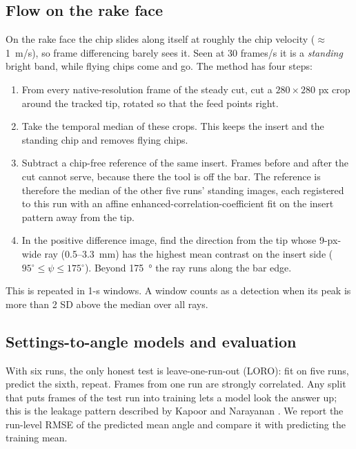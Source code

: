 \documentclass[conference,a4paper]{IEEEtran}
\newcommand{\degr}{\ensuremath{^\circ}}
\begin{document}
\subsection{Flow on the rake face}\label{sec:m-face}
On the rake face the chip slides along itself at roughly the chip velocity ($\approx$\SI{1}{m/s}), so frame differencing barely sees it.
Seen at 30 frames/s it is a \emph{standing} bright band, while flying chips come and go.
The method has four steps:
\begin{enumerate}
\item From every native-resolution frame of the steady cut, cut a $280\times280$ px crop around the tracked tip, rotated so that the feed points right.
\item Take the temporal median of these crops. This keeps the insert and the standing chip and removes flying chips.
\item Subtract a chip-free reference of the same insert. Frames before and after the cut cannot serve, because there the tool is off the bar. The reference is therefore the median of the other five runs' standing images, each registered to this run with an affine enhanced-correlation-coefficient fit \cite{evangelidis2008} on the insert pattern away from the tip.
\item In the positive difference image, find the direction from the tip whose 9-px-wide ray (0.5--\SI{3.3}{mm}) has the highest mean contrast on the insert side ($95\degr\le\psi\le175\degr$). Beyond \SI{175}{\degree} the ray runs along the bar edge.
\end{enumerate}
This is repeated in 1-s windows.
A window counts as a detection when its peak is more than 2 SD above the median over all rays.

\subsection{Settings-to-angle models and evaluation}\label{sec:m-models}
With six runs, the only honest test is leave-one-run-out (LORO): fit on five runs, predict the sixth, repeat.
Frames from one run are strongly correlated.
Any split that puts frames of the test run into training lets a model look the answer up; this is the leakage pattern described by Kapoor and Narayanan \cite{kapoor2023}.
We report the run-level RMSE of the predicted mean angle and compare it with predicting the training mean.
\end{document}
